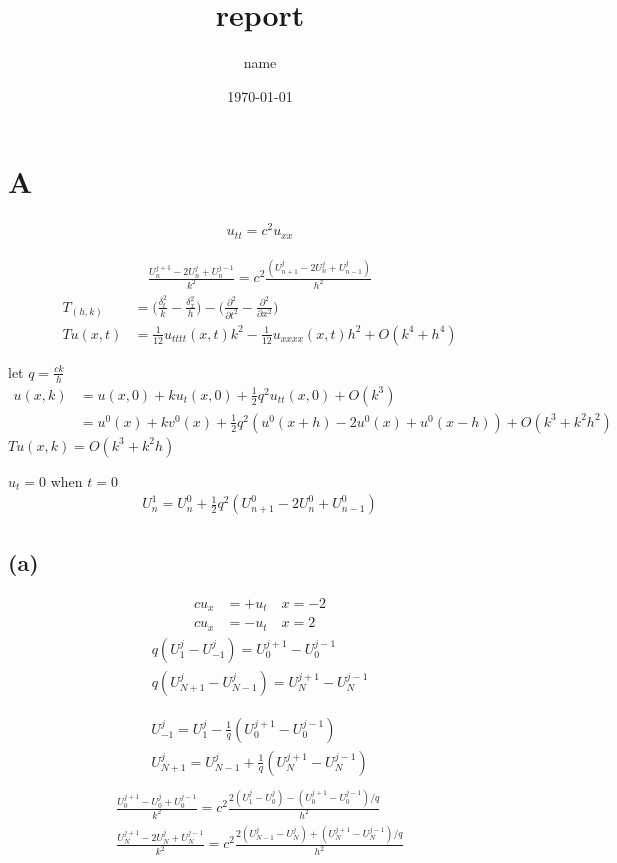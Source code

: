 \documentclass[en,hazy,screen,blue,normal]{elegantnote}
\title{report}
\author{name}
\date{\today}
\begin{document}
\maketitle

\section{A}
\begin{align*}
    u_{tt} = c^2 u_{xx}
\end{align*}

\begin{align}
    \frac{U_n^{j+1} - 2U_n^j + U_n^{j-1}}{k^2} = c^2 \frac{(U_{n+1}^j - 2U_n^j + U_{n-1}^j)}{h^2}
\end{align}
\begin{align*}
    T_{(h,k)} &= \biggl(\frac{\delta_t^2}{k} - \frac{\delta_x^2}{h}\biggr) - \biggl(\frac{\partial^2}{\partial t^2} - \frac{\partial^2}{\partial x^2}\biggr) \\
    Tu(x, t) &= \frac{1}{12} u_{tttt}(x, t) k^2 - \frac{1}{12} u_{xxxx}(x, t) h^2 + O(k^4 + h^4)
\end{align*}


let $q = \frac{ck}{h}$
\begin{align*}
    u(x, k) &= u(x, 0) + k u_t(x, 0) + \frac{1}{2} q^2 u_{tt}(x, 0) + O(k^3) \\
    &= u^0(x) + k v^0(x) + \frac{1}{2} q^2(u^0(x+h) - 2u^0(x) + u^0(x-h)) + O(k^3+k^2 h^2)
\end{align*}
$Tu(x, k) = O(k^3 + k^2h)$

$u_t = 0$ when $t=0$
\begin{align*}
    U_n^1 = U_n^0 + \frac{1}{2} q^2 (U_{n+1}^0 - 2U_{n}^0 + U_{n-1}^0)
\end{align*}

\subsection{(a)}
\begin{align*}
    c u_x &= + u_t \quad x=-2 \\
    c u_x &= - u_t \quad x=2
\end{align*}
\begin{align*}
    q (U_1^j - U_{-1}^j) = U_0^{j+1} - U_0^{j-1} \\
    q (U_{N+1}^j - U_{N-1}^j) = U_N^{j+1} - U_N^{j-1}
\end{align*}

\begin{align*}
    U_{-1}^{j} = U_1^j - \frac{1}{q} (U_0^{j+1}-U_0^{j-1}) \\
    U_{N+1}^{j} = U_{N-1}^j + \frac{1}{q} (U_N^{j+1}-U_N^{j-1}) \\
\end{align*}
\begin{align*}
    \frac{U_0^{j+1}-U_0^j+U_0^{j-1}}{k^2} = c^2 \frac{2(U_1^j -U_0^j) -(U_0^{j+1} -U_0^{j-1})/q}{h^2} \\
    \frac{U_{N}^{j+1}-2U_N^j+U_N^{j-1}}{k^2} = c^2 \frac{2(U_{N-1}^j - U_N^j) + (U_N^{j+1} - U_N^{j-1})/q}{h^2}
\end{align*}
\end{document}
